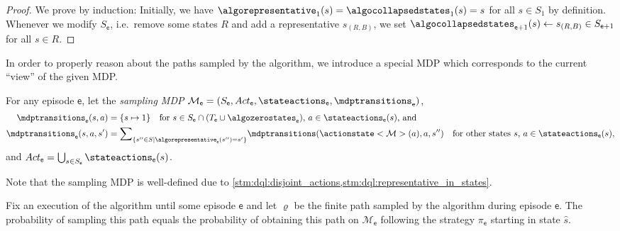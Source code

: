 \documentclass{theoretics}
\newcommand{\unionSym}{\cup}
\newcommand{\unionBin}{\mathbin{\unionSym}}
\newcommand{\intersectionSym}{\cap}
\newcommand{\intersectionBin}{\mathbin{\intersectionSym}}
\newcommand{\UnionSym}{\bigcup}
\newcommand{\union}{\unionBin}
\newcommand{\intersection}{\intersectionBin}
\newcommand{\Union}{\UnionSym}
\newcommand{\MDP}{\mathcal{M}}
\newcommand{\States}{S}
\newcommand{\initialstate}{\hat{s}}
\newcommand{\Actions}{Act}
\newcommand{\finitepath}{\varrho}
\newcommand{\strategy}{\pi}
\newcommand{\targetset}{T}
\newcommand{\algoepisode}{\mathsf{e}}
\begin{document}
\begin{proof}
	We prove by induction:
	Initially, we have $\algorepresentative_1(s) = \algocollapsedstates_1(s) = s$ for all $s \in \States_1$ by definition.
	Whenever we modify $\States_\algoepisode$, i.e.\ remove some states $R$ and add a representative $s_{(R, B)}$, we set $\algocollapsedstates_{\algoepisode + 1}(s) \gets s_{(R, B)} \in \States_{\algoepisode + 1}$ for all $s \in R$. 
\end{proof}
In order to properly reason about the paths sampled by the algorithm, we introduce a special MDP which corresponds to the current \enquote{view} of the given MDP.
\begin{definition} \label{def:dql:sampling_mdp}
	For any episode $\algoepisode$, let the \emph{sampling MDP} $\MDP_\algoepisode = (\States_\algoepisode, \Actions_\algoepisode, \stateactions_\algoepisode, \mdptransitions_\algoepisode)$,
	\begin{align*}
		\mdptransitions_\algoepisode(s, a) & = \{s \mapsto 1\} \quad \text{for $s \in \States_\algoepisode \intersection (\targetset_\algoepisode \union \algozerostates_\algoepisode)$, $a \in \stateactions_\algoepisode(s)$, and} \\
		\mdptransitions_\algoepisode(s, a, s') & = {\sum}_{\{s'' \in \States \mid \algorepresentative_\algoepisode(s'') = s'\}} \mdptransitions(\actionstate<\MDP>(a), a, s'') \quad \text{for other states $s$, $a \in \stateactions_\algoepisode(s)$},
	\end{align*}
	and $\Actions_\algoepisode = \Union_{s \in \States_\algoepisode} \stateactions_\algoepisode(s)$.
\end{definition}
Note that the sampling MDP is well-defined due to \cref{stm:dql:disjoint_actions,stm:dql:representative_in_states}.
\begin{lemma} \label{stm:dql:sampling_mdp}
	Fix an execution of the algorithm until some episode $\algoepisode$ and let $\finitepath$ be the finite path sampled by the algorithm during episode $\algoepisode$.
	The probability of sampling this path equals the probability of obtaining this path on $\MDP_\algoepisode$ following the strategy $\strategy_\algoepisode$ starting in state $\initialstate$.
\end{lemma}
\end{document}
